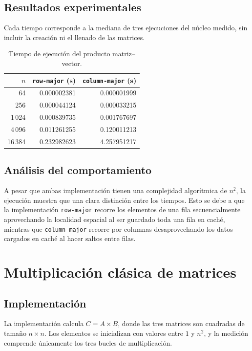 \documentclass[a4paper,12pt]{article}
\begin{document}
\subsection{Resultados experimentales}

Cada tiempo corresponde a la mediana de tres ejecuciones del núcleo medido,
sin incluir la creación ni el llenado de las matrices. 

\begin{table}[H]
    \centering
    \caption{Tiempo de ejecución del producto matriz--vector.}
    \label{tab:loop-times}
    \begin{tabular}{r r r}
        \toprule
        \(n\) & \texttt{row-major} (s) & \texttt{column-major} (s) \\
        \midrule
        64   & 0.000002381 & 0.000001999 \\
        256  & 0.000044124 & 0.000033215 \\
        1\,024 & 0.000839735 & 0.001767697 \\
        4\,096 & 0.011261255 & 0.120011213 \\
        16\,384 & 0.232982623 & 4.257951217 \\
        \bottomrule
    \end{tabular}
\end{table}

\subsection{Análisis del comportamiento}

A pesar que ambas implementación tienen una complejidad algorítmica de $n^2$, la ejecución muestra que una clara distinción entre los tiempos. Esto se debe a que la implementación \texttt{row-major} recorre los elementos de una fila secuencialmente aprovechando la localidad espacial al ser guardado toda una fila en caché, mientras que \texttt{column-major} recorre por columnas desaprovechando los datos cargados en caché al hacer saltos entre filas.

\section{Multiplicación clásica de matrices}

\subsection{Implementación}

La implementación calcula \(C=A\times B\), donde las tres matrices son
cuadradas de tamaño \(n\times n\). Los elementos se inicializan con valores
entre \(1\) y \(n^2\), y la medición comprende únicamente los tres bucles de
multiplicación.
\end{document}
